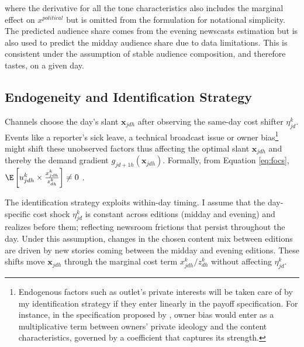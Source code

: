 \documentclass[12pt]{article}
\begin{document}
where the derivative for all the tone characteristics also includes the marginal effect on $x^{political}$ but is omitted from the formulation for notational simplicity. The predicted audience share comes from the evening newscasts estimation but is also used to predict the midday audience share due to data limitations. This is consistent under the assumption of stable audience composition, and therefore tastes, on a given day. 



\subsection{Endogeneity and Identification Strategy}


Channels choose the day’s slant \(\mathbf{x}_{jdh}\) after observing the same-day cost shifter \(\eta_{jd}^k\). Events like a reporter's sick leave, a technical broadcast issue or owner bias\footnote{Endogenous factors  such as outlet's private interests will be taken care of by my identification strategy if they enter linearly in the payoff specification. For instance, in the specification proposed by  \cite[][]{Anderson2010MediaMA}, owner bias would enter as a multiplicative term between owners' private ideology and the content characteristics, governed by a coefficient that captures its strength.} might shift these unobserved factors  thus affecting the optimal slant \(\mathbf{x}_{jdh}\) and thereby the demand gradient \(g_{jd+1h}(\mathbf{x}_{jdh})\).  Formally, from Equation \eqref{eq:focs},  $\E\left[u_{jdh}^k \times \frac{x_{jdh}^k}{z_{dh}^k}\right]\neq 0$ .




The identification strategy exploits within-day timing. I assume that the day-specific cost shock \(\eta_{jd}^k\) is constant across editions (midday and evening) and realizes before them; reflecting newsroom frictions that persist throughout the day. Under this assumption, changes in the chosen content mix between editions are driven by new stories coming between the midday and evening editions. These shifts move \(\bm x_{jdh}\) through the marginal cost term \(x_{jdh}^k / z_{dh}^k\) without affecting \(\eta_{jd}^k\).



\end{document}
